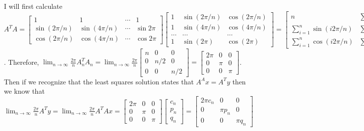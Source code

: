 \documentclass{article}
\begin{document}
\begin{enumerate}
\begin{enumerate}
        I will first calculate\\
        $A^TA = \begin{bmatrix}
        1 & 1 & \cdots & 1\\
        \sin(2\pi/n) & \sin(4\pi/n) & \cdots & \sin{2\pi}\\
        \cos(2\pi/n) & \cos(4\pi/n) & \cdots & \cos{2\pi}
        \end{bmatrix}
        \begin{bmatrix}
        1 & \sin(2\pi/n) & \cos(2\pi/n)\\
        1 & \sin(4\pi/n) & \cos(4\pi/n)\\
        \hdots & \hdots & \hdots\\
        1 & \sin(2\pi) & \cos(2\pi)
        \end{bmatrix} = \begin{bmatrix}
        n & \sum_{i=1}^n\sin(i2\pi/n) & \sum_{i=1}^n\cos(i2\pi/n)\\
        \sum_{i=1}^n\sin(i2\pi/n) & \sum_{i=1}^n\sin^2(i2\pi/n) &\sum_{i=1}^n\sin(i2\pi/n)\cos(i2\pi/n)\\
        \sum_{i=1}^n\cos(i2\pi/n) & \sum_{i=1}^n\sin(i2\pi/n)\cos(i2\pi/n) & \sum_{i=1}^n\cos^2(i2\pi/n)
        \end{bmatrix} = \begin{bmatrix}
        n & 0 & 0\\
        0 & n/2 & 0\\
        0 & 0 & n/2
        \end{bmatrix}$. Therefore, $\lim_{n\rightarrow\infty}\frac{2\pi}{n}A^T_nA_n = \lim_{n\rightarrow\infty}\frac{2\pi}{n}\begin{bmatrix}
        n & 0 & 0\\
        0 & n/2 & 0\\
        0 & 0 & n/2
        \end{bmatrix} = \begin{bmatrix}
        2\pi & 0 & 0\\
        0 & \pi & 0\\
        0 & 0 & \pi
        \end{bmatrix}$. Then if we recognize that the least squares solution states that $A^Ax = A^Ty$ then we know that $\lim_{n\rightarrow \infty} \frac{2\pi}{n}A^Ty = \lim_{n\rightarrow \infty}\frac{2\pi}{n}A^TAx = \begin{bmatrix}
        2\pi & 0 & 0\\
        0 & \pi & 0\\
        0 & 0 & \pi
        \end{bmatrix}\begin{bmatrix}
        c_n\\
        p_n\\
        q_n
        \end{bmatrix} = \begin{bmatrix}
        2\pi c_n & 0 & 0\\
        0 & \pi p_n & 0\\
        0 & 0 & \pi q_n
        \end{bmatrix}
        $
        

\end{enumerate}
\end{enumerate}
\end{document}
